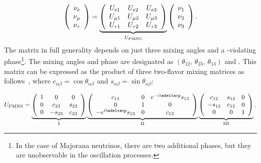\begin{equation}
\left(\begin{array}{ccc} \nu_e \\ \nu_\mu \\ \nu_\tau \end{array} \right)= 
\underbrace{
  \left(\begin{array}{ccc}
      U_{e 1} &  U_{e 2} & U_{e 3} \\ 
      U_{\mu1} &  U_{\mu2} & U_{\mu 3} \\ 
      U_{\tau 1} &  U_{\tau 2} & U_{\tau 3} 
    \end{array} \right)
}_{U_{\rm PMNS}} \left(\begin{array}{ccc} \nu_1 \\ \nu_2 \\ \nu_3 \end{array} \right).
\label{eqn:pmns0}
\end{equation}
The  matrix in full generality depends on just three mixing angles
and a -violating phase\footnote{In the case of Majorana neutrinos, there are two additional  phases, but they are unobservable in the oscillation processes.}.  The mixing angles and phase are designated
as $(\theta_{12},\, \theta_{23},\, \theta_{13})$ and
\deltacp.
This matrix can be expressed as the product of three
two-flavor mixing matrices as follows~\cite{Schechter:1980gr}, where $c_{\alpha \beta}=\cos \theta_{\alpha \beta}$ and $s_{\alpha
 \beta}=\sin \theta_{\alpha \beta}$:

\begin{equation}
U_{\rm PMNS} = 
  \underbrace{
    \left( \begin{array}{ccc}
        1 & 0 & 0 \\ 
        0 & c_{23} & s_{23} \\ 
        0 & -s_{23} & c_{23}
    \end{array} \right)
  }_{\rm I}
\underbrace{
  \left( \begin{array}{ccc}
        c_{13} & 0  & e^{-i\mdeltacp} s_{13} \\ 
         0 & 1 & 0 \\ 
        -e^{i\mdeltacp} s_{13} & 0 & c_{13}
  \end{array} \right)   
  }_{\rm II}
\underbrace{
 \left( \begin{array}{ccc}
      c_{12} & s_{12} & 0 \\ 
      -s_{12} & c_{12} & 0 \\ 
      0 & 0 & 1
  \end{array} \right)
}_{\rm III}.
\label{eqn:pmns}
\end{equation}

